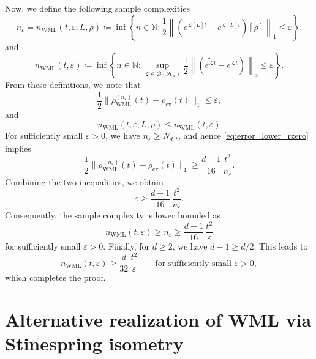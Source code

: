 \documentclass[superscriptaddress,amsmath,amssymb,aps,pra,letterpaper,tightenlines,notitlepages,12pt]{revtex4-2}
\begin{document}
Now, we define the following sample complexities
\begin{equation}
n_\varepsilon = n_{\mathrm{WML}}(t,\varepsilon;L,\rho)
\coloneqq  
\inf\left\{ n\in\mathbb N:\frac12\left\|\left({\widetilde{e^{\mathcal{L}[L]t}}} - e^{\mathcal{L}[L]t}\right)[\rho]\right\|_1 \le \varepsilon \right\}.
\end{equation}
and
\begin{equation}
n_{\mathrm{WML}}(t,\varepsilon)
\coloneqq  
\inf\left\{ n\in\mathbb N:\sup_{\mathcal{L}\in\mathcal{B}(\mathcal{H}_d)}\frac12\left\|\left({\widetilde{e^{\mathcal{L}t}}} - e^{\mathcal{L}t}\right)\right\|_\diamond \le \varepsilon \right\}.
\end{equation}
From these definitions, we note that 
\begin{equation}
\frac{1}{2}\|\rho_{\mathrm{WML}}^{(n_\varepsilon)}(t)-\rho_{\mathrm{ex}}(t)\|_1
\le \varepsilon,
\end{equation}
and
\begin{equation}
n_{\mathrm{WML}}(t,\varepsilon;L, \rho)\leq n_{\mathrm{WML}}(t,\varepsilon)
\end{equation}
For sufficiently small $\varepsilon>0$, we have $n_\varepsilon\ge N_{d,t}$, and hence \eqref{eq:error_lower_rzero} implies
\begin{equation}
\frac12\|\rho_{\mathrm{WML}}^{(n_\varepsilon)}(t)-\rho_{\mathrm{ex}}(t)\|_1
\ge \frac{d-1}{16}\,\frac{t^2}{n_\varepsilon}.
\end{equation}
Combining the two inequalities, we obtain
\begin{equation}
\varepsilon \ge \frac{d-1}{16}\,\frac{t^2}{n_\varepsilon}.
\end{equation}
Consequently, the sample complexity is lower bounded as
\begin{equation}
n_{\mathrm{WML}}(t,\varepsilon)\geq n_\varepsilon \ge \frac{d-1}{16}\,\frac{t^2}{\varepsilon}
\end{equation}
for sufficiently small $\varepsilon>0$.
Finally, for $d\ge2$, we have $d-1\ge d/2$. This leads to
\begin{equation}
n_{\mathrm{WML}}(t,\varepsilon)
\ge
\frac{d}{32}\,\frac{t^2}{\varepsilon}
\qquad \text{for sufficiently small }\varepsilon>0,
\end{equation}
which completes the proof.

\section{Alternative realization of WML via Stinespring isometry}
\end{document}
